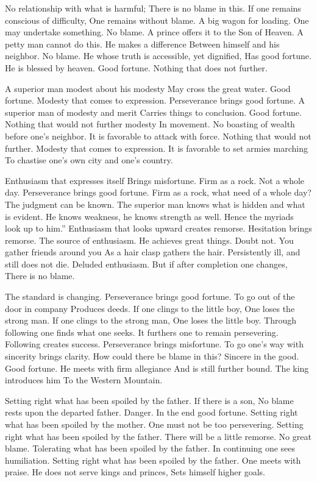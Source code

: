 {No relationship with what is harmful;
 There is no blame in this.
 If one remains conscious of difficulty,
 One remains without blame.}
{A big wagon for loading.
 One may undertake something.
 No blame.}
{A prince offers it to the Son of Heaven.
 A petty man cannot do this.}
{He makes a difference
 Between himself and his neighbor.
 No blame.}
{He whose truth is accessible, yet dignified,
 Has good fortune.}
{He is blessed by heaven.
 Good fortune.
 Nothing that does not further.}

{A superior man modest about his modesty
 May cross the great water.
 Good fortune.}
{Modesty that comes to expression.
 Perseverance brings good fortune.}
{A superior man of modesty and merit
 Carries things to conclusion.
 Good fortune.}
{Nothing that would not further modesty
 In movement.}
{No boasting of wealth before one’s neighbor.
 It is favorable to attack with force.
 Nothing that would not further.}
{Modesty that comes to expression.
 It is favorable to set armies marching
 To chastise one’s own city and one’s country.}

{Enthusiasm that expresses itself
 Brings misfortune.}
{Firm as a rock. Not a whole day.
 Perseverance brings good fortune.}
{Firm as a rock, what need of a whole day?
 The judgment can be known.
 The superior man knows what is hidden and what is evident.
 He knows weakness, he knows strength as well.
 Hence the myriads look up to him.”
 Enthusiasm that looks upward creates remorse.
 Hesitation brings remorse.}
{The source of enthusiasm.
 He achieves great things.
 Doubt not.
 You gather friends around you
 As a hair clasp gathers the hair.}
{Persistently ill, and still does not die.}
{Deluded enthusiasm.
 But if after completion one changes,
 There is no blame.}

{The standard is changing.
 Perseverance brings good fortune.
 To go out of the door in company
 Produces deeds.}
{If one clings to the little boy,
 One loses the strong man.}
{If one clings to the strong man,
 One loses the little boy.
 Through following one finds what one seeks.
 It furthers one to remain persevering.}
{Following creates success.
 Perseverance brings misfortune.
 To go one’s way with sincerity brings clarity.
 How could there be blame in this?
 Sincere in the good. Good fortune.}
{He meets with firm allegiance
 And is still further bound.
 The king introduces him
 To the Western Mountain.}
{}

{Setting right what has been spoiled by the father.
 If there is a son,
 No blame rests upon the departed father.
 Danger. In the end good fortune.}
{Setting right what has been spoiled by the mother.
 One must not be too persevering.}
{Setting right what has been spoiled by the father.
 There will be a little remorse. No great blame.}
{Tolerating what has been spoiled by the father.
 In continuing one sees humiliation.}
{Setting right what has been spoiled by the father.
 One meets with praise.}
{He does not serve kings and princes,
 Sets himself higher goals.}

